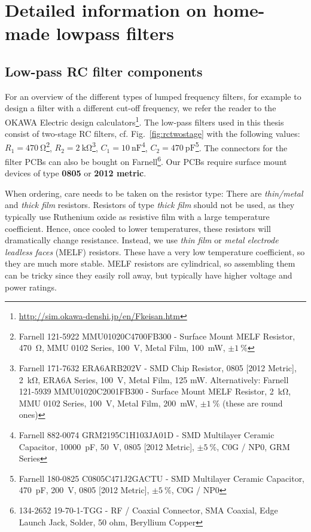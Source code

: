 \chapter{Detailed information on home-made lowpass filters}
\clearpage
\section{Low-pass RC filter components}\label{app:lowpassfilter}

For an overview of the different types of lumped frequency filters, for example to design a filter with a different cut-off frequency, we refer the reader to the OKAWA Electric design calculators\footnote{\url{http://sim.okawa-denshi.jp/en/Fkeisan.htm}}.
%
The low-pass filters used in this thesis consist of two-stage RC filters, cf. Fig.~\ref{fig:rctwostage} with the following values:
%
$R_1=\SI{470}{\ohm}$\footnote{Farnell 121-5922 MMU01020C4700FB300 - Surface Mount MELF Resistor, \SI{470}{\ohm}, MMU 0102 Series, \SI{100}{V}, Metal Film, \SI{100}{\milli\watt}, $\pm\SI{1}{\percent}$}, $R_2=\SI{2}{\kilo\ohm}$\footnote{Farnell 171-7632 ERA6ARB202V - SMD Chip Resistor, 0805 [2012 Metric], \SI{2}{\kilo\ohm}, ERA6A Series, \SI{100}{V}, Metal Film, 125 mW. Alternatively: Farnell 121-5939 MMU01020C2001FB300 - Surface Mount MELF Resistor, \SI{2}{\kilo\ohm}, MMU 0102 Series, \SI{100}{V}, Metal Film, \SI{200}{\milli\watt}, $\pm\SI{1}{\percent}$ (these are round ones)}, $C_1=\SI{10}{\nano\farad}$\footnote{Farnell 882-0074 GRM2195C1H103JA01D - SMD Multilayer Ceramic Capacitor, \SI{10000}{\pico\farad}, \SI{50}{V}, 0805 [2012 Metric], $\pm\SI{5}{\percent}$, C0G / NP0, GRM Series}, $C_2=\SI{470}{\pico\farad}$\footnote{Farnell 180-0825 C0805C471J2GACTU - SMD Multilayer Ceramic Capacitor, \SI{470}{\pico\farad}, \SI{200}{V}, 0805 [2012 Metric], $\pm\SI{5}{\percent}$, C0G / NP0}.
%
The connectors for the filter PCBs can also be bought on Farnell\footnote{134-2652 19-70-1-TGG - RF / Coaxial Connector, SMA Coaxial, Edge Launch Jack, Solder, 50 ohm, Beryllium Copper}.
%
Our PCBs require surface mount devices of type \textbf{0805} or \textbf{2012 metric}.

When ordering, care needs to be taken on the resistor type:
%
There are \textit{thin/metal} and \textit{thick film} resistors.
%
Resistors of type \textit{thick film} should not be used, as they typically use Ruthenium oxide as resistive film with a large temperature coefficient.
%
Hence, once cooled to lower temperatures, these resistors will dramatically change resistance.
%
Instead, we use \textit{thin film} or \textit{metal electrode leadless faces} (MELF) resistors.
%
These have a very low temperature coefficient, so they are much more stable.
%
MELF resistors are cylindrical, so assembling them can be tricky since they easily roll away, but typically have higher voltage and power ratings.

